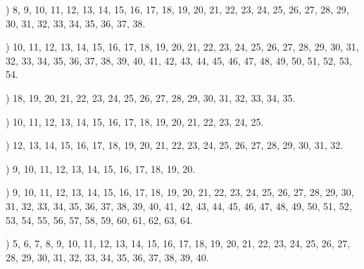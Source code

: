 \documentclass[a4paper,11pt]{article}
\begin{document}
\noindent
{}) 8, 9, 10, 11, 12, 13, 14, 15, 16, 17, 18, 19, 20, 21,
22, 23, 24, 25, 26, 27, 28, 29, 30, 31, 32, 33, 34, 35, 36, 37, 38.

\vspace{\spaceFour}



\noindent
{}) 10, 11, 12, 13, 14, 15, 16, 17, 18, 19, 20, 21, 22,
23, 24, 25, 26, 27, 28, 29, 30, 31, 32, 33, 34, 35, 36, 37, 38, 39,
40, 41, 42, 43, 44, 45, 46, 47, 48, 49, 50, 51, 52, 53, 54.

\vspace{\spaceFour}



\noindent
{}) 18, 19, 20, 21, 22, 23, 24, 25, 26, 27, 28, 29, 30,
31, 32, 33, 34, 35.

\vspace{\spaceFour}



\noindent
{}) 10, 11, 12, 13, 14, 15, 16, 17, 18, 19, 20, 21, 22,
23, 24, 25.

\vspace{\spaceFour}



\noindent
{}) 12, 13, 14, 15, 16, 17, 18, 19, 20, 21, 22, 23, 24,
25, 26, 27, 28, 29, 30, 31, 32.

\vspace{\spaceFour}



\noindent
{}) 9, 10, 11, 12, 13, 14, 15, 16, 17, 18, 19, 20.

\vspace{\spaceFour}



\noindent
{}) 9, 10, 11, 12, 13, 14, 15, 16, 17, 18, 19, 20, 21,
22, 23, 24, 25, 26, 27, 28, 29, 30, 31, 32, 33, 34, 35, 36, 37, 38,
39, 40, 41, 42, 43, 44, 45, 46, 47, 48, 49, 50, 51, 52, 53, 54, 55,
56, 57, 58, 59, 60, 61, 62, 63, 64.

\vspace{\spaceFour}



\noindent
{}) 5, 6, 7, 8, 9, 10, 11, 12, 13, 14, 15, 16, 17, 18,
19, 20, 21, 22, 23, 24, 25, 26, 27, 28, 29, 30, 31, 32, 33, 34, 35,
36, 37, 38, 39, 40.

\vspace{\spaceFour}
\end{document}
